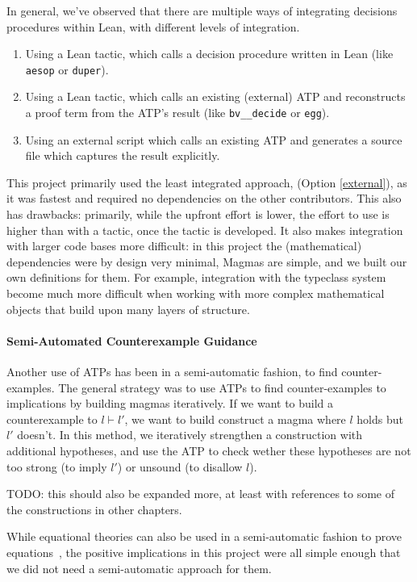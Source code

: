 In general, we've observed that there are multiple ways of integrating decisions procedures within Lean, with different levels of integration.
\begin{enumerate}
    \item Using a Lean tactic, which calls a decision procedure written in Lean (like \texttt{aesop} or \texttt{duper}).
    \item Using a Lean tactic, which calls an existing (external) ATP and reconstructs a proof term from the ATP's result (like \texttt{bv\__decide} or \texttt{egg}).
    \item\label{external} Using an external script which calls an existing ATP and generates a source file  which captures the result explicitly.
\end{enumerate}


This project primarily used the least integrated approach, (Option \ref{external}), as it was fastest and required no dependencies on the other contributors.
This also has drawbacks: primarily, while the upfront effort is lower, the effort to use is higher than with a tactic, once the tactic is developed.
It also makes integration with larger code bases more difficult: in this project the (mathematical) dependencies were by design very minimal, Magmas are simple, and we built our own definitions for them.
For example, integration with the typeclass system become much more difficult when working with more complex mathematical objects that build upon many layers of structure.

\paragraph{Semi-Automated Counterexample Guidance}

Another use of ATPs has been in a semi-automatic fashion, to find counter-examples.
The general strategy was to use ATPs to find counter-examples to implications by building magmas iteratively.
If we want to build a counterexample to $l \vdash l'$, we want to build construct a magma where $l$ holds but $l'$ doesn't.
In this method, we iteratively strengthen a construction with additional hypotheses, and use the ATP to check wether these hypotheses are not too strong (to imply $l'$) or unsound (to disallow $l$).

TODO: this should also be expanded more, at least with references to some of the constructions in other chapters.

While equational theories can also be used in a semi-automatic fashion to prove equations~\cite{DBLP:journals/pacmpl/KoehlerGBGTS24}, the positive implications in this project were all simple enough that we did not need a semi-automatic approach for them.

